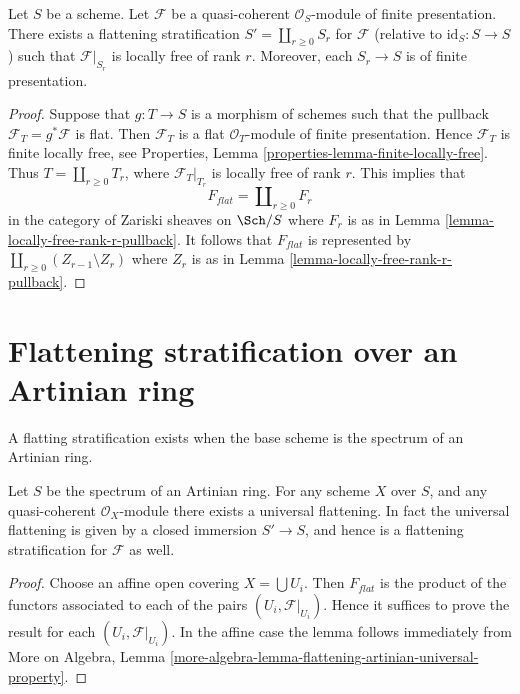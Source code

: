 \begin{lemma}
\label{lemma-finite-presentation-module}
Let $S$ be a scheme. Let $\mathcal{F}$ be a quasi-coherent
$\mathcal{O}_S$-module of finite presentation.
There exists a flattening stratification $S' = \coprod_{r \geq 0} S_r$
for $\mathcal{F}$ (relative to $\text{id}_S : S \to S$) such that
$\mathcal{F}|_{S_r}$ is locally free of rank $r$. Moreover, each
$S_r \to S$ is of finite presentation.
\end{lemma}

\begin{proof}
Suppose that $g : T \to S$ is a morphism of schemes such that the pullback
$\mathcal{F}_T = g^*\mathcal{F}$ is flat. Then $\mathcal{F}_T$ is a flat
$\mathcal{O}_T$-module of finite presentation. Hence
$\mathcal{F}_T$ is finite locally free, see
Properties, Lemma \ref{properties-lemma-finite-locally-free}.
Thus $T = \coprod_{r \geq 0} T_r$, where $\mathcal{F}_T|_{T_r}$ is locally
free of rank $r$. This implies that
$$
F_{flat} = \coprod\nolimits_{r \geq 0} F_r
$$
in the category of Zariski sheaves on $\Sch/S$ where $F_r$ is as in
Lemma \ref{lemma-locally-free-rank-r-pullback}. It follows
that $F_{flat}$ is represented by
$\coprod_{r \geq 0} (Z_{r - 1} \setminus Z_r)$ where
$Z_r$ is as in
Lemma \ref{lemma-locally-free-rank-r-pullback}.
\end{proof}



\section{Flattening stratification over an Artinian ring}
\label{section-flattening-artinian}

\noindent
A flatting stratification exists when the base scheme is the spectrum
of an Artinian ring.

\begin{lemma}
\label{lemma-flattening-stratification-artinian}
Let $S$ be the spectrum of an Artinian ring.
For any scheme $X$ over $S$, and any quasi-coherent $\mathcal{O}_X$-module
there exists a universal flattening. In fact the universal flattening
is given by a closed immersion $S' \to S$, and hence is a flattening
stratification for $\mathcal{F}$ as well.
\end{lemma}

\begin{proof}
Choose an affine open covering $X = \bigcup U_i$.
Then $F_{flat}$ is the product of the functors associated to
each of the pairs $(U_i, \mathcal{F}|_{U_i})$.
Hence it suffices to prove the result for each
$(U_i, \mathcal{F}|_{U_i})$.
In the affine case the lemma follows immediately from
More on Algebra,
Lemma \ref{more-algebra-lemma-flattening-artinian-universal-property}.
\end{proof}






